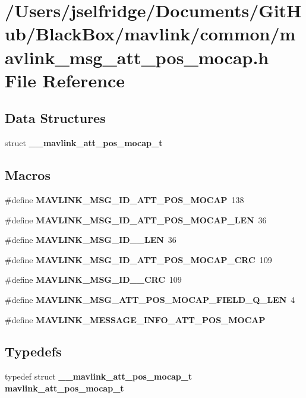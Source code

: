 \section{/\+Users/jselfridge/\+Documents/\+Git\+Hub/\+Black\+Box/mavlink/common/mavlink\+\_\+msg\+\_\+att\+\_\+pos\+\_\+mocap.h File Reference}
\label{mavlink__msg__att__pos__mocap_8h}
\subsection*{Data Structures}
\begin{DoxyCompactItemize}
\item 
struct \textbf{ \+\_\+\+\_\+mavlink\+\_\+att\+\_\+pos\+\_\+mocap\+\_\+t}
\end{DoxyCompactItemize}
\subsection*{Macros}
\begin{DoxyCompactItemize}
\item 
\#define \textbf{ M\+A\+V\+L\+I\+N\+K\+\_\+\+M\+S\+G\+\_\+\+I\+D\+\_\+\+A\+T\+T\+\_\+\+P\+O\+S\+\_\+\+M\+O\+C\+AP}~138
\item 
\#define \textbf{ M\+A\+V\+L\+I\+N\+K\+\_\+\+M\+S\+G\+\_\+\+I\+D\+\_\+\+A\+T\+T\+\_\+\+P\+O\+S\+\_\+\+M\+O\+C\+A\+P\+\_\+\+L\+EN}~36
\item 
\#define \textbf{ M\+A\+V\+L\+I\+N\+K\+\_\+\+M\+S\+G\+\_\+\+I\+D\+\_\+\_\+\+L\+EN}~36
\item 
\#define \textbf{ M\+A\+V\+L\+I\+N\+K\+\_\+\+M\+S\+G\+\_\+\+I\+D\+\_\+\+A\+T\+T\+\_\+\+P\+O\+S\+\_\+\+M\+O\+C\+A\+P\+\_\+\+C\+RC}~109
\item 
\#define \textbf{ M\+A\+V\+L\+I\+N\+K\+\_\+\+M\+S\+G\+\_\+\+I\+D\+\_\+\_\+\+C\+RC}~109
\item 
\#define \textbf{ M\+A\+V\+L\+I\+N\+K\+\_\+\+M\+S\+G\+\_\+\+A\+T\+T\+\_\+\+P\+O\+S\+\_\+\+M\+O\+C\+A\+P\+\_\+\+F\+I\+E\+L\+D\+\_\+\+Q\+\_\+\+L\+EN}~4
\item 
\#define \textbf{ M\+A\+V\+L\+I\+N\+K\+\_\+\+M\+E\+S\+S\+A\+G\+E\+\_\+\+I\+N\+F\+O\+\_\+\+A\+T\+T\+\_\+\+P\+O\+S\+\_\+\+M\+O\+C\+AP}
\end{DoxyCompactItemize}
\subsection*{Typedefs}
\begin{DoxyCompactItemize}
\item 
typedef struct \textbf{ \+\_\+\+\_\+mavlink\+\_\+att\+\_\+pos\+\_\+mocap\+\_\+t} \textbf{ mavlink\+\_\+att\+\_\+pos\+\_\+mocap\+\_\+t}
\end{DoxyCompactItemize}


